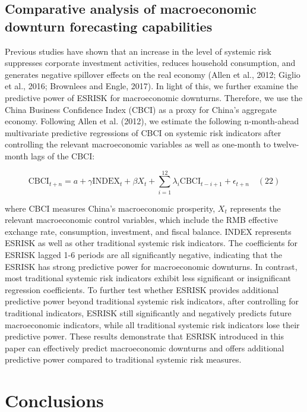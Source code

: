 \documentclass[12pt,a4paper]{article}
\begin{document}
    \subsection{Comparative analysis of macroeconomic downturn forecasting capabilities}

    Previous studies have shown that an increase in the level of systemic risk suppresses corporate investment activities, reduces household consumption, and generates negative spillover effects on the real economy (Allen et al., 2012; Giglio et al., 2016; Brownlees and Engle, 2017). In light of this, we further examine the predictive power of ESRISK for macroeconomic downturns. Therefore, we use the China Business Confidence Index (CBCI) as a proxy for China's aggregate economy. Following Allen et al. (2012), we estimate the following n-month-ahead multivariate predictive regressions of CBCI on systemic risk indicators after controlling the relevant macroeconomic variables as well as one-month to twelve-month lags of the CBCI:

    \[
    \mathrm{CBCI}_{t+n} = a + \gamma \mathrm{INDEX}_t + \beta X_t + \sum_{i=1}^{12}\lambda_i\mathrm{CBCI}_{t-i+1} + \epsilon_{t+n} \quad (22)
    \]

    where CBCI measures China's macroeconomic prosperity, $X_{t}$ represents the relevant macroeconomic control variables, which include the RMB effective exchange rate, consumption, investment, and fiscal balance. INDEX represents ESRISK as well as other traditional systemic risk indicators. The coefficients for ESRISK lagged 1-6 periods are all significantly negative, indicating that the ESRISK has strong predictive power for macroeconomic downturns. In contrast, most traditional systemic risk indicators exhibit less significant or insignificant regression coefficients. To further test whether ESRISK provides additional predictive power beyond traditional systemic risk indicators, after controlling for traditional indicators, ESRISK still significantly and negatively predicts future macroeconomic indicators, while all traditional systemic risk indicators lose their predictive power. These results demonstrate that ESRISK introduced in this paper can effectively predict macroeconomic downturns and offers additional predictive power compared to traditional systemic risk measures.

    \section{Conclusions}
\end{document}
